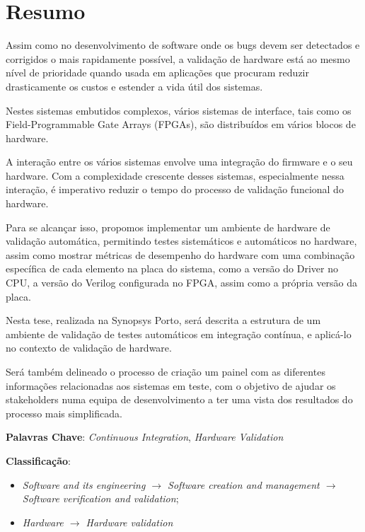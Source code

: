 \chapter*{Resumo}

Assim como no desenvolvimento de software onde os bugs devem ser detectados e corrigidos o mais rapidamente possível, a validação de hardware está ao mesmo nível de prioridade quando usada em aplicações que procuram reduzir drasticamente os custos e estender a vida útil dos sistemas.

\sloppy
Nestes sistemas embutidos complexos, vários sistemas de interface, tais como os Field-Programmable Gate Arrays (FPGAs), são distribuídos em vários blocos de hardware.

A interação entre os vários sistemas envolve uma integração do firmware e o seu hardware.
Com a complexidade crescente desses sistemas, especialmente nessa interação, é imperativo reduzir o tempo do processo de validação funcional do hardware.

Para se alcançar isso, propomos implementar um ambiente de hardware de validação automática, permitindo testes sistemáticos e automáticos no hardware, assim como mostrar métricas de desempenho do hardware com uma combinação específica de cada elemento na placa do sistema, como a versão do Driver no CPU, a versão do Verilog configurada no FPGA, assim como a própria versão da placa.

Nesta tese, realizada na Synopsys Porto, será descrita a estrutura de um ambiente de validação de testes automáticos em integração contínua, e aplicá-lo no contexto de validação de hardware. 

Será também delineado o processo de criação um painel com as diferentes informações relacionadas aos sistemas em teste, com o objetivo de ajudar os stakeholders numa equipa de desenvolvimento a ter uma vista dos resultados do processo mais simplificada.

\vspace*{10mm}\noindent

\noindent\textbf{Palavras Chave}: \emph{Continuous Integration}, \emph{Hardware Validation}

\vspace*{5mm}\noindent

\noindent\textbf{Classificação}: 
\begin{itemize}
\item \emph{Software and its engineering $\rightarrow$ Software creation and management $\rightarrow$ Software verification and validation}; 
\item \emph{Hardware $\rightarrow$ Hardware validation}
\end{itemize}